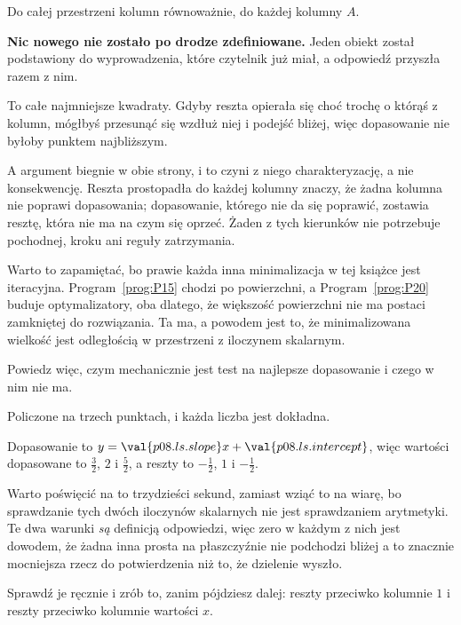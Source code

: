\begin{fr}
\begin{ansblock}
Do całej przestrzeni kolumn \dash{} równoważnie, do każdej kolumny $A$.
\end{ansblock}

\textbf{Nic nowego nie zostało po drodze zdefiniowane.} Jeden obiekt został
podstawiony do wyprowadzenia, które czytelnik już miał, a odpowiedź przyszła
razem z nim.

To całe najmniejsze kwadraty. Gdyby reszta opierała się choć trochę o którąś z
kolumn, mógłbyś przesunąć się wzdłuż niej i podejść bliżej, więc dopasowanie
nie byłoby punktem najbliższym.

A argument biegnie w obie strony, i to czyni z niego charakteryzację, a nie
konsekwencję. Reszta prostopadła do każdej kolumny znaczy, że żadna kolumna nie
poprawi dopasowania; dopasowanie, którego nie da się poprawić, zostawia resztę,
która nie ma na czym się oprzeć. Żaden z tych kierunków nie potrzebuje
pochodnej, kroku ani reguły zatrzymania.

Warto to zapamiętać, bo prawie każda inna minimalizacja w tej książce jest
iteracyjna. Program~\ref{prog:P15} chodzi po powierzchni, a
Program~\ref{prog:P20} buduje optymalizatory, oba dlatego, że większość
powierzchni nie ma postaci zamkniętej do rozwiązania. Ta ma, a powodem jest
to, że minimalizowana wielkość jest odległością w przestrzeni z iloczynem
skalarnym.

Powiedz więc, czym mechanicznie jest test na najlepsze dopasowanie i czego w
nim nie ma.
\dotline
\nextframe
\end{fr}

\begin{fr}
Policzone na trzech punktach, i każda liczba jest dokładna.

Dopasowanie to $y = \val{p08.ls.slope}x + \val{p08.ls.intercept}$, więc wartości
dopasowane to $\frac{3}{2}$, $2$ i $\frac{5}{2}$, a reszty to
$-\frac{1}{2}$, $1$ i $-\frac{1}{2}$.

Warto poświęcić na to trzydzieści sekund, zamiast wziąć to na wiarę, bo
sprawdzanie tych dwóch iloczynów skalarnych nie jest sprawdzaniem arytmetyki.
Te dwa warunki \emph{są} definicją odpowiedzi, więc zero w każdym z nich jest
dowodem, że żadna inna prosta na płaszczyźnie nie podchodzi bliżej \dash{} a to
znacznie mocniejsza rzecz do potwierdzenia niż to, że dzielenie wyszło.

Sprawdź je ręcznie i zrób to, zanim pójdziesz dalej: reszty przeciwko kolumnie
$1$ i reszty przeciwko kolumnie wartości $x$.
\dotline
\nextframe
\end{fr}

